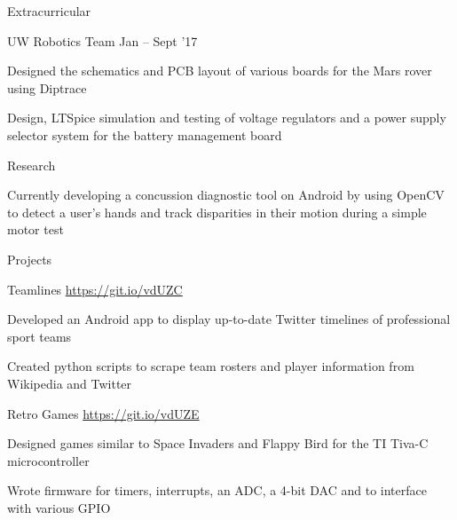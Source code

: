 \documentclass{resume} %
\begin{document}
	
	\begin{rSection}{Extracurricular}
	
		\begin{rSubsection}{UW Robotics Team}
			{}
			{}
			{Jan -- Sept '17}

			\item Designed the schematics and PCB layout of various boards for the Mars rover using Diptrace
			\item Design, LTSpice simulation and testing of voltage regulators and a power supply selector system for the battery management board

		\end{rSubsection}

		\begin{rSubsection}{Research}			
			{}
			{}
			{}


			\item Currently developing a concussion diagnostic tool on Android by using OpenCV to detect a user's hands and track disparities in their motion during a simple motor test
		\end{rSubsection}	
	\end{rSection}

	
	\begin{rSection}{Projects}
		\begin{rSubsection}{Teamlines}
			{\href{https://git.io/vdUZC}{https://git.io/vdUZC}}
			{}{}
			
			\item Developed an Android app to display up-to-date Twitter timelines of professional sport teams
			\item Created python scripts to scrape team rosters and player information from Wikipedia and Twitter
		\end{rSubsection}
		\begin{rSubsection}{Retro Games}
			{\href{https://git.io/vdUZE}{https://git.io/vdUZE}}
			{}{}
		
			\item Designed games similar to Space Invaders and Flappy Bird for the TI Tiva-C microcontroller
			\item Wrote firmware for timers, interrupts, an ADC, a 4-bit DAC and to interface with various GPIO
		\end{rSubsection}
	\end{rSection}
	
\end{document}
